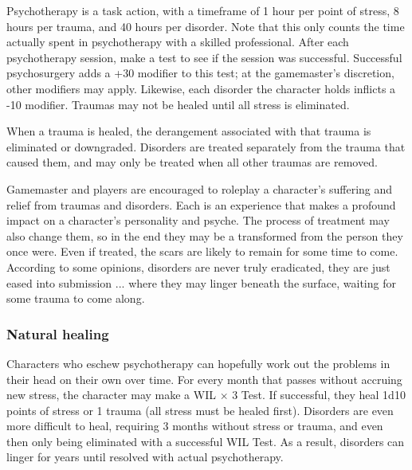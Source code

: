 Psychotherapy is a task action, with a timeframe of 1 hour per point of stress, 8 hours per trauma, and 40 hours per disorder. Note that this only counts the time actually spent in psychotherapy with a skilled professional. After each psychotherapy session, make a test to see if the session was successful. Successful psychosurgery adds a +30 modifier to this test; at the gamemaster’s discretion, other modifiers may apply. Likewise, each disorder the character holds inflicts a -10 modifier. Traumas may not be healed until all stress is eliminated.

When a trauma is healed, the derangement associated with that trauma is eliminated or downgraded. Disorders are treated separately from the trauma that caused them, and may only be treated when all other traumas are removed.

Gamemaster and players are encouraged to roleplay a character’s suffering and relief from traumas and disorders. Each is an experience that makes a profound impact on a character’s personality and psyche. The process of treatment may also change them, so in the end they may be a transformed from the person they once were. Even if treated, the scars are likely to remain for some time to come. According to some opinions, disorders are never truly eradicated, they are just eased into submission ... where they may linger beneath the surface, waiting for some trauma to come along.

\subsubsection{Natural healing}

Characters who eschew psychotherapy can hopefully work out the problems in their head on their own over time. For every month that passes without accruing new stress, the character may make a WIL $\times$ 3 Test. If successful, they heal 1d10 points of stress or 1 trauma (all stress must be healed first). Disorders are even more difficult to heal, requiring 3 months without stress or trauma, and even then only being eliminated with a successful WIL Test. As a result, disorders can linger for years until resolved with actual psychotherapy.

